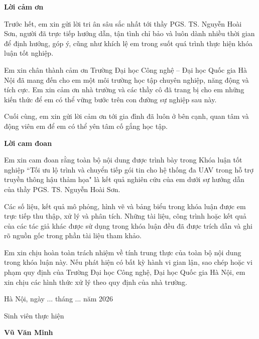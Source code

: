 
\begin{thankpage}
{}
{\huge \bfseries Lời cảm ơn}


Trước hết, em xin gửi lời tri ân sâu sắc nhất tới thầy PGS. TS. Nguyễn Hoài Sơn, người đã trực tiếp hướng dẫn, tận tình chỉ bảo và luôn dành nhiều thời gian để định hướng, góp ý, cũng như khích lệ em trong suốt quá trình thực hiện khóa luận tốt
nghiệp. 

Em xin chân thành cảm ơn Trường Đại học Công nghệ – Đại học Quốc gia Hà Nội đã mang đến cho em một môi trường học tập chuyên nghiệp, năng động và tích cực. Em xin cảm ơn nhà trường và các thầy cô đã trang bị cho em những kiến thức để em có thể vững bước trên con đường sự nghiệp sau này.

Cuối cùng, em xin gửi lời cảm ơn tới gia đình đã luôn ở bên cạnh, quan tâm và động viên em để em có thể yên tâm cố gắng học tập.

\newpage

{}
{\huge \bfseries Lời cam đoan}


Em xin cam đoan rằng toàn bộ nội dung được trình bày trong Khóa luận tốt nghiệp “Tối ưu lộ trình và chuyển tiếp gói tin cho hệ thống đa UAV trong hỗ trợ truyền thông hậu thảm họa" là kết quả nghiên cứu của em dưới sự hướng dẫn của thầy PGS. TS. Nguyễn Hoài Sơn.

Các số liệu, kết quả mô phỏng, hình vẽ và bảng biểu trong khóa luận được em trực tiếp thu thập, xử lý và phân tích. Những tài liệu, công trình hoặc kết quả của các tác giả khác được sử dụng trong khóa luận đều đã được trích dẫn và ghi rõ nguồn gốc trong phần tài liệu tham khảo.

Em xin chịu hoàn toàn trách nhiệm về tính trung thực của toàn bộ nội dung trong khóa luận này. Nếu phát hiện có bất kỳ hành vi gian lận, sao chép hoặc vi phạm quy định của Trường Đại học Công nghệ, Đại học Quốc gia Hà Nội, em xin chịu các hình thức xử lý theo quy định của nhà trường.

\vspace{1cm}

\begin{flushright}
\begin{minipage}{0.5\textwidth}
\centering
Hà Nội, ngày ... tháng ... năm 2026

Sinh viên thực hiện

\vspace{2cm}

\textbf{Vũ Văn Minh}
\end{minipage}
\end{flushright}
\end{thankpage}
\newpage
